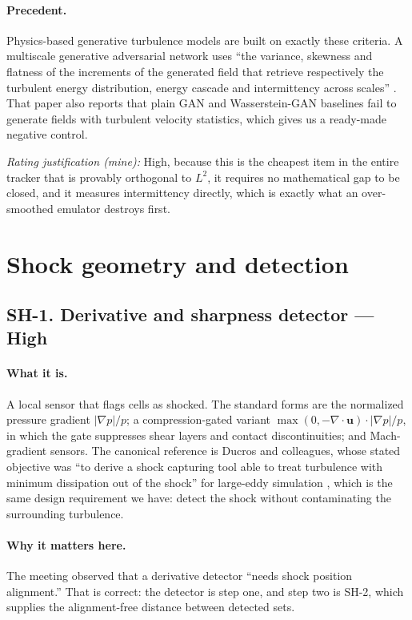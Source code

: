 \documentclass[11pt]{article}
\newcommand{\High}{\textbf{High}}
\newcommand{\rating}[1]{\par\smallskip\noindent\textit{Rating justification (mine):} #1}
\begin{document}
\paragraph{Precedent.} Physics-based generative turbulence models are built on exactly these
criteria. A multiscale generative adversarial network uses ``the variance, skewness and
flatness of the increments of the generated field that retrieve respectively the turbulent
energy distribution, energy cascade and intermittency across scales''
\cite{granero2024}. That paper also reports that plain GAN and Wasserstein-GAN baselines
fail to generate fields with turbulent velocity statistics, which gives us a ready-made
negative control.

\rating{High, because this is the cheapest item in the entire tracker that is provably
orthogonal to $L^2$, it requires no mathematical gap to be closed, and it measures
intermittency directly, which is exactly what an over-smoothed emulator destroys first.}

\section{Shock geometry and detection}

\subsection{SH-1. Derivative and sharpness detector --- \High{}}

\paragraph{What it is.} A local sensor that flags cells as shocked. The standard forms are
the normalized pressure gradient $|\nabla p| / p$; a compression-gated variant
$\max(0, -\nabla\cdot\mathbf{u}) \cdot |\nabla p| / p$, in which the gate suppresses shear
layers and contact discontinuities; and Mach-gradient sensors. The canonical reference is
Ducros and colleagues, whose stated objective was ``to derive a shock capturing tool able to
treat turbulence with minimum dissipation out of the shock'' for large-eddy simulation
\cite{ducros1999}, which is the same design requirement we have: detect the shock without
contaminating the surrounding turbulence.

\paragraph{Why it matters here.} The meeting observed that a derivative detector ``needs
shock position alignment.'' That is correct: the detector is step one, and step two is
SH-2, which supplies the alignment-free distance between detected sets.
\end{document}
